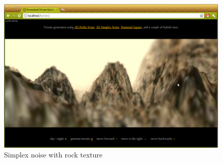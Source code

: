 \begin{figure}
	\center
	\includegraphics[scale=0.4]{images/demo_3_3.png}
	\caption{Simplex noise with rock texture}
	\label{fig:demo_3_3}
\end{figure}

